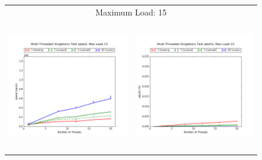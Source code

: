 \begin{figure}[h!]
\begin{tabular}{|cc|}
        \hline 
        \multicolumn{2}{|c|}{{\footnotesize Maximum Load: 15}}\\
        \includegraphics[height=2.25in]{maps/15HM125K:F34,I33,E33speed.png} &
    \includegraphics[height=2.25in]{maps/15HM125K:F34,I33,E33aborts.png}\\
    \hline 
    \end{tabular}
\label{fig:ntqueues}
\end{figure}
